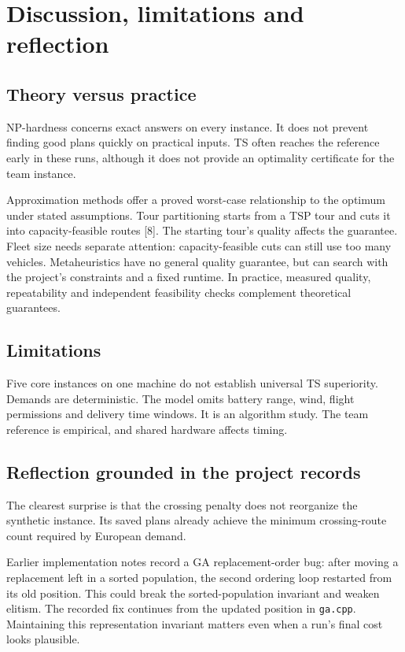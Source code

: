 \section{Discussion, limitations and reflection}
\subsection*{Theory versus practice}
NP-hardness concerns exact answers on every instance. It does not prevent finding good plans
quickly on practical inputs. TS often reaches the reference early in these runs, although it
does not provide an optimality certificate for the team instance.

Approximation methods offer a proved worst-case relationship to the optimum under stated
assumptions. Tour partitioning starts from a TSP tour and cuts it into capacity-feasible routes
[8]. The starting tour's quality affects the guarantee. Fleet size needs separate attention:
capacity-feasible cuts can still use too many vehicles. Metaheuristics have no general quality
guarantee, but can search with the project's constraints and a fixed runtime. In practice,
measured quality, repeatability and independent feasibility checks complement theoretical guarantees.

\subsection*{Limitations}
Five core instances on one machine do not establish universal TS superiority. Demands are
deterministic. The model omits battery range, wind, flight permissions and delivery time windows.
It is an algorithm study. The team reference is empirical, and shared hardware affects timing.

\subsection*{Reflection grounded in the project records}
The clearest surprise is that the crossing penalty does not reorganize the synthetic instance.
Its saved plans already achieve the minimum crossing-route count required by European demand.

Earlier implementation notes record a GA replacement-order bug: after moving a replacement
left in a sorted population, the second ordering loop restarted from its old position. This
could break the sorted-population invariant and weaken elitism. The recorded fix continues
from the updated position in \texttt{ga.cpp}. Maintaining this representation invariant matters
even when a run's final cost looks plausible.

